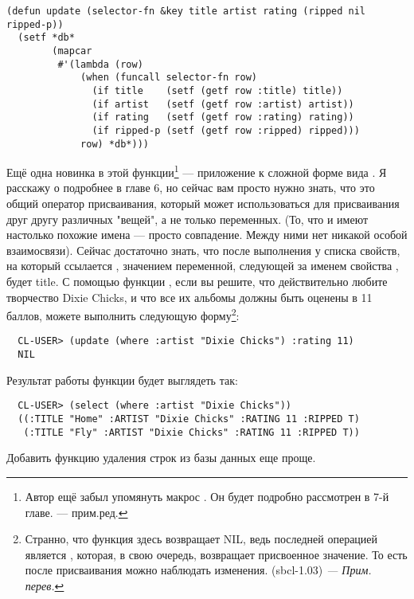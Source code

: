 \begin{lstlisting}
(defun update (selector-fn &key title artist rating (ripped nil ripped-p))
  (setf *db*
        (mapcar
         #'(lambda (row)
             (when (funcall selector-fn row)
               (if title    (setf (getf row :title) title))
               (if artist   (setf (getf row :artist) artist))
               (if rating   (setf (getf row :rating) rating))
               (if ripped-p (setf (getf row :ripped) ripped)))
             row) *db*)))
\end{lstlisting}

Ещё одна новинка в этой функции\footnote{Автор ещё забыл упомянуть макрос . Он
  будет подробно рассмотрен в 7-й главе. --- прим.ред.} --- приложение  к
сложной форме вида . Я расскажу о  подробнее в главе 6,
но сейчас вам просто нужно знать, что это общий оператор присваивания, который может
использоваться для присваивания друг другу различных "вещей", а не только переменных. (То,
что  и  имеют настолько похожие имена --- просто совпадение. Между
ними нет никакой особой взаимосвязи). Сейчас достаточно знать, что после выполнения
 у списка свойств, на который ссылается ,
значением переменной, следующей за именем свойства , будет title. С помощью
функции , если вы решите, что действительно любите творчество Dixie Chicks, и
что все их альбомы должны быть оценены в 11 баллов, можете выполнить следующую
форму\footnote{Странно, что функция  здесь возвращает NIL, ведь последней
  операцией является , которая, в свою очередь, возвращает
  присвоенное значение. То есть после присваивания можно наблюдать изменения. (sbcl-1.03)
  \textit{--- Прим. перев.}}:

\begin{verbatim}
  CL-USER> (update (where :artist "Dixie Chicks") :rating 11)
  NIL
\end{verbatim}

Результат работы функции будет выглядеть так:

\begin{verbatim}
  CL-USER> (select (where :artist "Dixie Chicks"))
  ((:TITLE "Home" :ARTIST "Dixie Chicks" :RATING 11 :RIPPED T)
   (:TITLE "Fly" :ARTIST "Dixie Chicks" :RATING 11 :RIPPED T))
\end{verbatim}

Добавить функцию удаления строк из базы данных еще проще.


